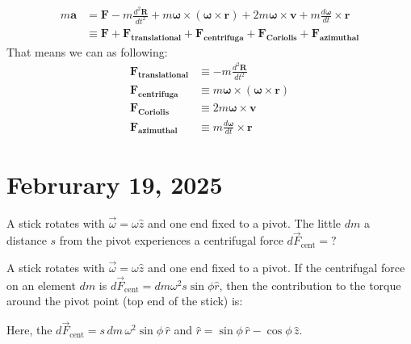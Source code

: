 \documentclass[11pt]{article}
\begin{document}
\begin{equation}
	\begin{aligned}
		m\mathbf{a} & = \mathbf{F} - m\frac{d^2\mathbf{R}}{dt^2} + m\boldsymbol{\omega} \times (\boldsymbol{\omega} \times \mathbf{r}) + 2m\boldsymbol{\omega} \times \mathbf{v} + m\frac{d\boldsymbol{\omega}}{dt} \times \mathbf{r} \\
		            & \equiv \mathbf{F} + \mathbf{F_{translational}} + \mathbf{F_{centrifuga}} + \mathbf{F_{Coriolis}} + \mathbf{F_{azimuthal}}
	\end{aligned}\label{eq:10.10}
\end{equation}
That means we can  as following:
\begin{equation}
	\begin{aligned}
		\mathbf{F_{translational}} & \equiv -m\frac{d^2\mathbf{R}}{dt^2}                                        \\
		\mathbf{F_{centrifuga}}    & \equiv m\boldsymbol{\omega} \times (\boldsymbol{\omega} \times \mathbf{r}) \\
		\mathbf{F_{Coriolis}}      & \equiv 2m\boldsymbol{\omega} \times \mathbf{v}                             \\
		\mathbf{F_{azimuthal}}     & \equiv m\frac{d\boldsymbol{\omega}}{dt} \times \mathbf{r}
	\end{aligned}\label{eq:10.11}
\end{equation}


\section{Februrary 19, 2025}
\begin{example}
	A stick rotates with \(\vec{\omega} = \omega \hat{z}\) and one end fixed to a pivot. The little \(dm\) a distance \(s\) from the pivot experiences a centrifugal force \(d\vec{F}_{\text{cent}} = ?\)
\end{example}

\begin{solution}

\end{solution}
\begin{example}
	A stick rotates with \(\vec{\omega} = \omega \hat{z}\) and one end fixed to a pivot. If the centrifugal force on an element \(dm\) is \(d\vec{F}_{\text{cent}} = dm \omega^2 s \sin\phi \hat{r}\), then the contribution to the torque around the pivot point (top end of the stick) is:
\end{example}
\begin{solution}
	Here, the \(d\vec{F}_{\text{cent}} = s \, dm \, \omega^2 \sin\phi \, \hat{r}\) and \(\hat{r} = \sin\phi \, \hat{r} - \cos\phi \, \hat{z}\).
\end{solution}
\end{document}
